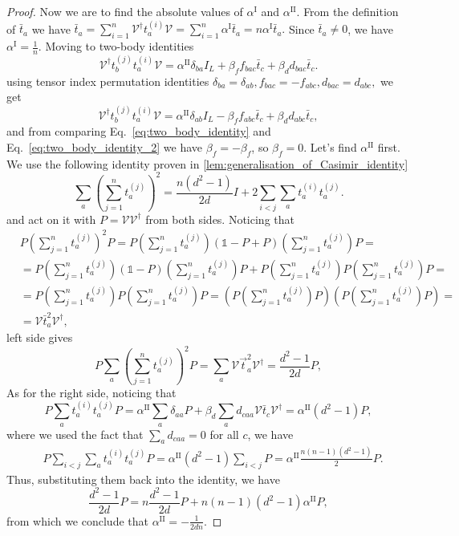 \documentclass[11pt,letterpaper]{article}
\theoremstyle{plain}
\theoremstyle{plain}
\theoremstyle{plain}
\theoremstyle{plain}
\theoremstyle{plain}
\theoremstyle{plain}
\theoremstyle{plain}
\theoremstyle{definition}
\theoremstyle{plain}
\begin{document}
\begin{proof}
Now we are to find the absolute values of $\alpha^{\text{I}}$ and $\alpha^{\text{II}}$. 
From the definition of $\bar{t}_a$ we have
$
\bar{t}_a=\sum_{i=1}^n \mathcal{V}^{\dagger} t_a^{(i)} \mathcal{V}=\sum_{i=1}^n \alpha^{\text{I}} \bar{t}_a=n \alpha^{\text{I}} \bar{t}_a.
$
Since $\bar{t}_a \neq 0$, we have $\alpha^{\text{I}}=\frac{1}{n}$.
Moving to two-body identities
\begin{equation}\label{eq:two_body_identity}
    \mathcal{V}^{\dagger} t_b^{(j)} t_a^{(i)} \mathcal{V}=\alpha^{\text{II}} \delta_{b a} I_L+\beta_{f} f_{b ac} \bar{t}_c +\beta_{d} d_{b ac} \bar{t}_c .
\end{equation}
using tensor index permutation identities
$
    \delta_{b a}=\delta_{a b}, f_{b ac}=-f_{a bc},  d_{b ac}=d_{a bc},
$
we get
\begin{equation}\label{eq:two_body_identity_2}
    \mathcal{V}^{\dagger} t_b^{(j)} t_a^{(i)} \mathcal{V}=\alpha^{\text{II}} \delta_{a b} I_L-\beta_{f} f_{a bc} \bar{t}_c +\beta_{d} d_{a bc} \bar{t}_c ,
\end{equation}
and  from comparing Eq.~\eqref{eq:two_body_identity} and Eq.~\eqref{eq:two_body_identity_2} we have $\beta_{f}=-\beta_{f}$, so $\beta_{f}=0$. Let's find $\alpha^{\text{II}}$ first.
We use the following identity proven in \ref{lem:generalisation_of_Casimir_identity}
\[
    \sum_a\left(\sum_{j=1}^n t^{(j)}_a\right)^2=\frac{n\left(d^2-1\right)}{2 d} I+2 \sum_{i<j} \sum_a t^{(i)}_a t^{(j)}_a.
\]
and act on it with $P=\mathcal{V} \mathcal{V}^{\dagger}$ from both sides. 
Noticing that
\begin{align}
    &P\left(\sum_{j=1}^n t^{(j)}_a\right)^2 P=P\left(\sum_{j=1}^n t^{(j)}_a\right)(\mathbb{1}-P+P)\left(\sum_{j=1}^n t^{(j)}_a\right)P=\\&=P\left(\sum_{j=1}^n t^{(j)}_a\right) 
    (\mathbb{1}-P)\left(\sum_{j=1}^n t^{(j)}_a\right)P+P\left(\sum_{j=1}^n t^{(j)}_a\right) P\left(\sum_{j=1}^n t^{(j)}_a\right)P=\\&=P\left(\sum_{j=1}^n t^{(j)}_a\right) 
    P\left(\sum_{j=1}^n t^{(j)}_a\right)P=\left(P\left(\sum_{j=1}^n t^{(j)}_a\right) P\right)\left(P\left(\sum_{j=1}^n t^{(j)}_a\right)P\right)=\\&=\mathcal{V}\bar{t}_a^2 \mathcal{V}^{\dagger},
\end{align}
left side gives
\[
    P \sum_a\left(\sum_{j=1}^n t^{(j)}_a\right)^2 P=\sum_a \mathcal{V}\vec{t}_a^2 \mathcal{V}^{\dagger} =\frac{d^2-1}{2 d} P,
\]
As for the right side, noticing that
\[
    P \sum_a t_a^{(i)} t_a^{(j)} P=\alpha^{\text{II}} \sum_a\delta_{a a} P+\beta_{d} \sum_a d_{c a a} \mathcal{V}\bar{t}_c \mathcal{V}^{\dagger}=\alpha^{\text{II}}(d^2-1) P,
\]
where we used the fact that $\sum_a d_{c a a}=0$ for all $c$, we have
\begin{align}
    &P \sum_{i<j} \sum_a t^{(i)}_a t^{(j)}_a P=\alpha^{\text{II}}(d^2-1) \sum_{i<j} P=\alpha^{\text{II}} \frac{n(n-1)(d^2-1)}{2} P.
\end{align}
Thus, substituting them back into the identity, we have
\[
    \frac{d^2-1}{2 d} P=n \frac{d^2-1}{2 d} P+n(n-1)\left(d^2-1\right) \alpha^{\text{II}} P,
\]
from which we conclude that $\alpha^{\text{II}}=-\frac{1}{2dn}$.


\end{proof}
\end{document}
